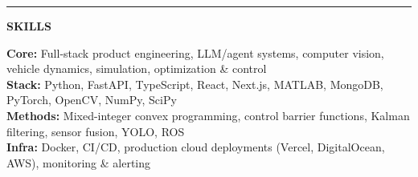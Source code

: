 \documentclass[10pt,letterpaper]{article}
\newlength{\sectionspaceabove}    \setlength{\sectionspaceabove}{8pt}   %
\newlength{\sectionlinetotitlegap}    \setlength{\sectionlinetotitlegap}{0pt}   %
\newlength{\sectiontitletocontentgap} \setlength{\sectiontitletocontentgap}{-8pt}  %
\newcommand{\sectionfontsize}{\fontsize{10pt}{10pt}\selectfont}
\newcommand{\ressection}[1]{%
  \vspace{\sectionspaceabove}%
  \hrule
  \vspace{\sectionlinetotitlegap}%
  \begin{center}{\sectionfontsize\textbf{#1}}\end{center}%
  \vspace{\sectiontitletocontentgap}%
}
\begin{document}
\ressection{SKILLS}

\noindent\textbf{Core:} Full-stack product engineering, LLM/agent systems, computer vision, vehicle dynamics, simulation, optimization \& control \\
\textbf{Stack:} Python, FastAPI, TypeScript, React, Next.js, MATLAB, MongoDB, PyTorch, OpenCV, NumPy, SciPy \\
\textbf{Methods:} Mixed-integer convex programming, control barrier functions, Kalman filtering, sensor fusion, YOLO, ROS \\
\textbf{Infra:} Docker, CI/CD, production cloud deployments (Vercel, DigitalOcean, AWS), monitoring \& alerting
\end{document}
